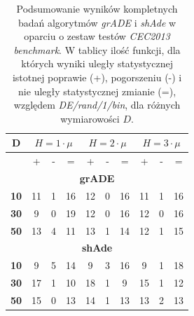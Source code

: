 \documentclass[12pt,a4paper]{report}
\begin{document}
{{{{{{{\begin{table}[h]
\centering
\caption{Podsumowanie wyników kompletnych badań algorytmów \emph{grADE} i \emph{shAde} w oparciu o zestaw testów \emph{CEC2013 benchmark}. W tablicy ilość funkcji, dla których wyniki uległy statystycznej istotnej poprawie (+), pogorszeniu (-) i nie uległy statystycznej zmianie (=), względem \emph{DE/rand/1/bin}, dla różnych wymiarowości $D$.}
\label{shAde_and_grADE}
\begin{tabular}{|c|c|c|c||c|c|c||c|c|c|}
\hline
{\bf D}  & \multicolumn{3}{c||}{{\bf $H = 1 \cdot \mu$}} & \multicolumn{3}{c||}{{\bf $H = 2 \cdot \mu$}} & \multicolumn{3}{c|}{{\bf $H = 3 \cdot \mu$}} \\ \hline
         & +             & -             & =            & +             & -             & =            & +             & -             & =            \\ \hline
\multicolumn{10}{|c|}{{\bf grADE}}                                                                                                                    \\ \hline
{\bf 10} & 11 & 1	& 16	& 12	&0	&16&	11&	1	&16 \\ \hline
{\bf 30} &  9&	0	&19	&12&	0&	16	&12	&0	&16
\\ \hline
{\bf 50} & 13&	4&	11&	13	&1&	14&	12&	1&	15 \\ \hline
\multicolumn{10}{|c|}{{\bf shAde}}                                                                                                                    \\ \hline
{\bf 10} & 9&	5	&14&	9	&3	&16	&9	&1	&18
\\ \hline
{\bf 30} & 17&	1&	10	&18	&1&	9&	15&	1&	12 \\ \hline
{\bf 50} & 15&	0&	13&	14&	1&	13&	13&	2&	13 \\ \hline
\end{tabular}
\end{table}

}}}}}}}
\end{document}
